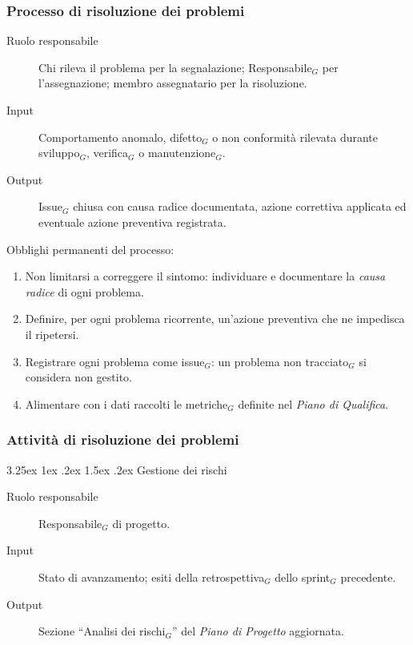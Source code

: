 \documentclass[a4paper, 10pt]{article}
\makeatletter
\renewcommand\paragraph{\@startsection{paragraph}{4}{\z@}%
  {3.25ex \@plus1ex \@minus .2ex}%
  {1.5ex \@plus .2ex}%
  {\normalfont\normalsize\bfseries}}
\makeatother
\begin{document}
\subsubsection{Processo di risoluzione dei problemi}
\label{subsubsec:processo_risoluzione}

\begin{description}
    \item[Ruolo responsabile] Chi rileva il problema per la segnalazione; Responsabile$_G$ per l'assegnazione; membro assegnatario per la risoluzione.
    \item[Input] Comportamento anomalo, difetto$_G$ o non conformità rilevata durante sviluppo$_G$, verifica$_G$ o manutenzione$_G$.
    \item[Output] Issue$_G$ chiusa con causa radice documentata, azione correttiva applicata ed eventuale azione preventiva registrata.
\end{description}

\noindent Obblighi permanenti del processo:
\begin{enumerate}
    \item Non limitarsi a correggere il sintomo: individuare e documentare la \emph{causa radice} di ogni problema.
    \item Definire, per ogni problema ricorrente, un'azione preventiva che ne impedisca il ripetersi.
    \item Registrare ogni problema come issue$_G$: un problema non tracciato$_G$ si considera non gestito.
    \item Alimentare con i dati raccolti le metriche$_G$ definite nel \emph{Piano di Qualifica}.
\end{enumerate}

\subsubsection{Attività di risoluzione dei problemi}
\label{subsubsec:attivita_risoluzione}

\paragraph{Gestione dei rischi}

\begin{description}
    \item[Ruolo responsabile] Responsabile$_G$ di progetto.
    \item[Input] Stato di avanzamento; esiti della retrospettiva$_G$ dello sprint$_G$ precedente.
    \item[Output] Sezione ``Analisi dei rischi$_G$'' del \emph{Piano di Progetto} aggiornata.
\end{description}
\end{document}
